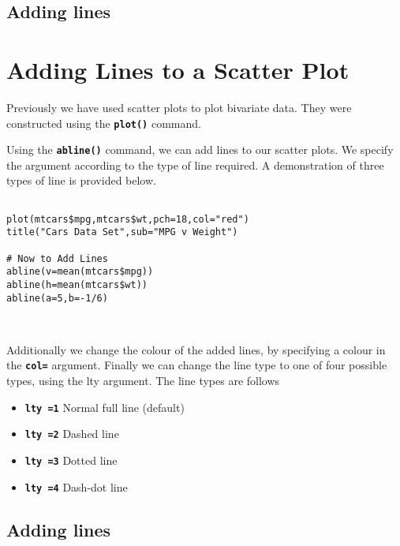 \documentclass[a4paper,12pt]{article}
\begin{document}
\subsection{Adding lines}



\section*{Adding Lines to a Scatter Plot}
Previously we have used scatter plots to plot bivariate data. They were constructed using the \texttt{\textbf{plot()}} command.  

Using the \texttt{\textbf{abline()}} command, we can add lines to our scatter plots. We specify the argument according to the type of line required. A demonstration of three types of line is provided below.



\begin{framed}
\begin{verbatim}

plot(mtcars$mpg,mtcars$wt,pch=18,col="red")
title("Cars Data Set",sub="MPG v Weight")

# Now to Add Lines
abline(v=mean(mtcars$mpg))
abline(h=mean(mtcars$wt))
abline(a=5,b=-1/6)
\end{verbatim}
\end{framed}

~%

Additionally we change the colour of the added lines, by specifying a colour in the \texttt{\textbf{col=}} argument. Finally we can change the line type to one of four possible types, using the lty argument.
The line types are follows 
\begin{itemize}
\item \texttt{\textbf{lty =1}}   Normal full line (default)
\item \texttt{\textbf{lty =2}}  Dashed line 
\item \texttt{\textbf{lty =3}}   Dotted line
\item \texttt{\textbf{lty =4}}   Dash-dot line
\end{itemize}


\subsection{Adding lines}
\end{document}
